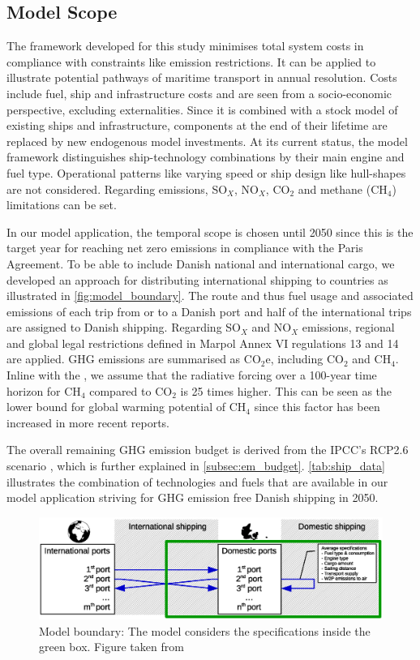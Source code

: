 \documentclass[article]{elsarticle}
\begin{document}
\subsection{Model Scope}
\label{subsec:Scope}
The framework developed for this study minimises total system costs in compliance with constraints like emission restrictions. It can be applied to illustrate potential pathways of maritime transport in annual resolution. Costs include fuel, ship and infrastructure costs and are seen from a socio-economic perspective, excluding externalities. Since it is combined with a stock model of existing ships and infrastructure, components at the end of their lifetime are replaced by new endogenous model investments. At its current status, the model framework distinguishes ship-technology combinations by their main engine and fuel type. Operational patterns like varying speed or ship design like hull-shapes are not considered.
Regarding emissions, SO$_X$, NO$_X$, CO$_2$ and methane (CH$_4$) limitations can be set.

In our model application, the temporal scope is chosen until 2050 since this is the target year for reaching net zero emissions in compliance with the Paris Agreement. To be able to include Danish national and international cargo, we developed an approach for distributing international shipping to countries as illustrated in \autoref{fig:model_boundary}. The route and thus fuel usage and associated emissions of each trip from or to a Danish port and half of the international trips are assigned to Danish shipping. Regarding SO$_X$ and NO$_X$ emissions, regional and global legal restrictions defined in Marpol Annex VI regulations 13 and 14 \cite{IMO2008a,IMO2008b} are applied. GHG emissions are summarised as CO$_2$e, including CO$_2$ and CH$_4$. Inline with the \citet{IPCC2007}, we assume that the radiative forcing over a 100-year time horizon for CH$_4$ compared to CO$_2$ is 25 times higher. This can be seen as the lower bound for global warming potential of CH$_4$ since this factor has been increased in more recent reports.

The overall remaining GHG emission budget is derived from the IPCC's RCP2.6 scenario \cite[p.~27]{IPCC2013}, which is further explained in \autoref{subsec:em_budget}. \autoref{tab:ship_data} illustrates the combination of technologies and fuels that are available in our model application striving for GHG emission free Danish shipping in 2050.

\begin{figure}[htb]
    \centering
    \includegraphics[width=\textwidth]{figures/model_boundary_paper.eps}
    \caption{Model boundary: The model considers the specifications inside the green box. Figure taken from \cite{Thesis2018}}
    \label{fig:model_boundary}
\end{figure}
\end{document}
